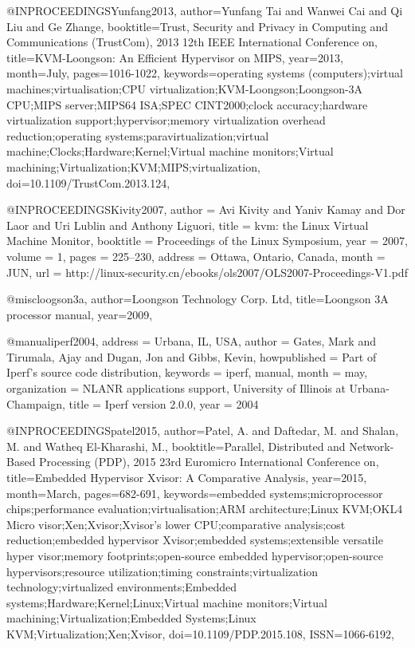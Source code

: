 @INPROCEEDINGS{Yunfang2013, 
author={Yunfang Tai and Wanwei Cai and Qi Liu and Ge Zhange}, 
booktitle={Trust, Security and Privacy in Computing and Communications (TrustCom), 2013 12th IEEE International Conference on}, 
title={KVM-Loongson: An Efficient Hypervisor on MIPS}, 
year={2013}, 
month={July}, 
pages={1016-1022}, 
keywords={operating systems (computers);virtual machines;virtualisation;CPU virtualization;KVM-Loongson;Loongson-3A CPU;MIPS server;MIPS64 ISA;SPEC CINT2000;clock accuracy;hardware virtualization support;hypervisor;memory virtualization overhead reduction;operating systems;paravirtualization;virtual machine;Clocks;Hardware;Kernel;Virtual machine monitors;Virtual machining;Virtualization;KVM;MIPS;virtualization}, 
doi={10.1109/TrustCom.2013.124},}

@INPROCEEDINGS{Kivity2007,
  author = {Avi Kivity and Yaniv Kamay and Dor Laor and Uri Lublin and Anthony
	Liguori},
  title = {kvm: the Linux Virtual Machine Monitor},
  booktitle = {Proceedings of the Linux Symposium},
  year = {2007},
  volume = {1},
  pages = {225--230},
  address = {Ottawa, Ontario, Canada},
  month = JUN,
  url = {http://linux-security.cn/ebooks/ols2007/OLS2007-Proceedings-V1.pdf}
}

@misc{loogson3a,
	author={{Loongson Technology Corp. Ltd}},
	title={Loongson 3A processor manual},
	year={2009},
}

@manual{iperf2004,
    address = {Urbana, IL, USA},
    author = {Gates, Mark and Tirumala, Ajay and Dugan, Jon and Gibbs, Kevin},
    howpublished = {Part of Iperf's source code distribution},
    keywords = {iperf, manual},
    month = may,
    organization = {NLANR applications support, University of Illinois at Urbana-Champaign},
    title = {Iperf version 2.0.0},
    year = {2004}
}

@INPROCEEDINGS{patel2015, 
author={Patel, A. and Daftedar, M. and Shalan, M. and Watheq El-Kharashi, M.}, 
booktitle={Parallel, Distributed and Network-Based Processing (PDP), 2015 23rd Euromicro International Conference on}, 
title={Embedded Hypervisor Xvisor: A Comparative Analysis}, 
year={2015}, 
month={March}, 
pages={682-691}, 
keywords={embedded systems;microprocessor chips;performance evaluation;virtualisation;ARM architecture;Linux KVM;OKL4 Micro visor;Xen;Xvisor;Xvisor's lower CPU;comparative analysis;cost reduction;embedded hypervisor Xvisor;embedded systems;extensible versatile hyper visor;memory footprints;open-source embedded hypervisor;open-source hypervisors;resource utilization;timing constraints;virtualization technology;virtualized environments;Embedded systems;Hardware;Kernel;Linux;Virtual machine monitors;Virtual machining;Virtualization;Embedded Systems;Linux KVM;Virtualization;Xen;Xvisor}, 
doi={10.1109/PDP.2015.108}, 
ISSN={1066-6192},}

